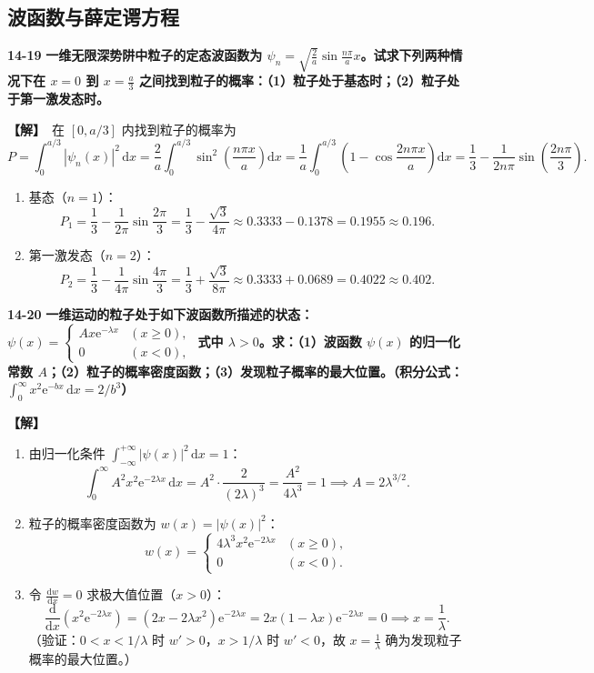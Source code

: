 \documentclass[zihao=5,a4paper,UTF8]{ctexart}
\newenvironment{prob}[2]{%
    \par\vspace{6pt}\noindent\textbf{\color{navy}#1} \textbf{#2}\par\nopagebreak\vspace{2pt}%
}{%
    \par\vspace{4pt}%
}
\newcommand{\sol}{\noindent\textbf{\color{tealaccent}【解】}\ }
\newcommand{\dd}{\mathrm{d}}
\newcommand{\ee}{\mathrm{e}}
\begin{document}
\subsection{波函数与薛定谔方程}

\begin{prob}{14-19}{一维无限深势阱中粒子的定态波函数为 $\psi_n = \sqrt{\frac{2}{a}}\sin\frac{n\pi}{a}x$。试求下列两种情况下在 $x=0$ 到 $x=\frac{a}{3}$ 之间找到粒子的概率：（1）粒子处于基态时；（2）粒子处于第一激发态时。}
\sol 在 $[0, a/3]$ 内找到粒子的概率为
\[
    P = \int_0^{a/3} |\psi_n(x)|^2\,\dd x = \frac{2}{a}\int_0^{a/3} \sin^2\left(\frac{n\pi x}{a}\right)\dd x = \frac{1}{a}\int_0^{a/3}\left(1 - \cos\frac{2n\pi x}{a}\right)\dd x = \frac{1}{3} - \frac{1}{2n\pi}\sin\left(\frac{2n\pi}{3}\right).
\]
\begin{enumerate}[leftmargin=2em, itemsep=2pt]
    \item 基态（$n=1$）：
    \[
        P_1 = \frac{1}{3} - \frac{1}{2\pi}\sin\frac{2\pi}{3} = \frac{1}{3} - \frac{\sqrt{3}}{4\pi} \approx 0.3333 - 0.1378 = 0.1955 \approx 0.196.
    \]
    \item 第一激发态（$n=2$）：
    \[
        P_2 = \frac{1}{3} - \frac{1}{4\pi}\sin\frac{4\pi}{3} = \frac{1}{3} + \frac{\sqrt{3}}{8\pi} \approx 0.3333 + 0.0689 = 0.4022 \approx 0.402.
    \]
\end{enumerate}
\end{prob}

\begin{prob}{14-20}{一维运动的粒子处于如下波函数所描述的状态：$\psi(x) = \begin{cases} Ax\ee^{-\lambda x} & (x\ge 0),\\ 0 & (x<0), \end{cases}$ 式中 $\lambda > 0$。求：（1）波函数 $\psi(x)$ 的归一化常数 $A$；（2）粒子的概率密度函数；（3）发现粒子概率的最大位置。（积分公式：$\int_0^\infty x^2\ee^{-bx}\,\dd x = 2/b^3$）}
\sol
\begin{enumerate}[leftmargin=2em, itemsep=2pt]
    \item 由归一化条件 $\int_{-\infty}^{+\infty} |\psi(x)|^2\,\dd x = 1$：
    \[
        \int_0^\infty A^2 x^2 \ee^{-2\lambda x}\,\dd x = A^2 \cdot \frac{2}{(2\lambda)^3} = \frac{A^2}{4\lambda^3} = 1 \implies A = 2\lambda^{3/2}.
    \]
    \item 粒子的概率密度函数为 $w(x) = |\psi(x)|^2$：
    \[
        w(x) = \begin{cases} 4\lambda^3 x^2 \ee^{-2\lambda x} & (x \ge 0),\\ 0 & (x < 0). \end{cases}
    \]
    \item 令 $\frac{\dd w}{\dd x} = 0$ 求极大值位置（$x>0$）：
    \[
        \frac{\dd}{\dd x}\left(x^2 \ee^{-2\lambda x}\right) = (2x - 2\lambda x^2)\ee^{-2\lambda x} = 2x(1 - \lambda x)\ee^{-2\lambda x} = 0 \implies x = \frac{1}{\lambda}.
    \]
    （验证：$0<x<1/\lambda$ 时 $w'>0$，$x>1/\lambda$ 时 $w'<0$，故 $x = \frac{1}{\lambda}$ 确为发现粒子概率的最大位置。）
\end{enumerate}
\end{prob}
\end{document}
